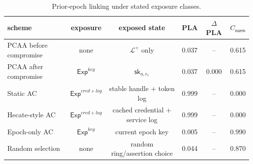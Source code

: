\begin{table}[htbp]
\centering
\caption{Prior-epoch linking under stated exposure classes.}
\label{tab:unlinkability-current-key}
\begin{tabular}{@{}lccccc@{}}
\toprule
scheme & exposure & exposed state & PLA & $\Delta$PLA & $C_{\mathsf{norm}}$ \\
\midrule
PCAA before compromise & none & $\mathcal{L}^{+}$ only & 0.037 & -- & 0.615 \\
PCAA after compromise & $\mathsf{Exp}^{key}$ & $\mathsf{sk}_{u,e_c}$ & 0.037 & 0.000 & 0.615 \\
Static AC & $\mathsf{Exp}^{cred+log}$ & stable handle + token log & 0.999 & -- & 0.000 \\
Hecate-style AC & $\mathsf{Exp}^{cred+log}$ & cached credential + service log & 0.999 & -- & 0.000 \\
Epoch-only AC & $\mathsf{Exp}^{key}$ & current epoch key & 0.005 & -- & 0.990 \\
Random selection & none & random ring/assertion choice & 0.044 & -- & 0.870 \\
\bottomrule
\end{tabular}
\end{table}
